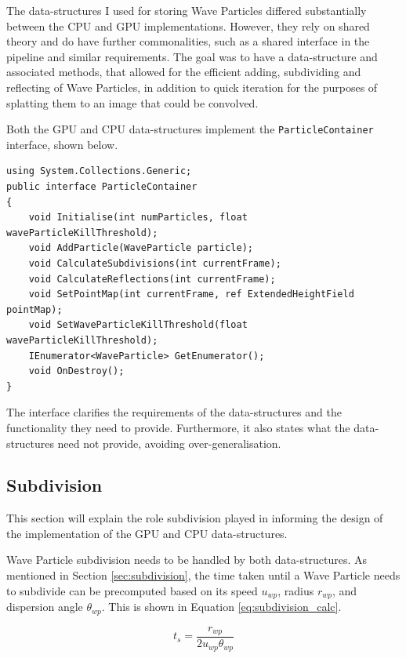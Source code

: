 \documentclass[12pt,a4paper,twoside]{report}
\begin{document}
The data-structures I used for storing Wave Particles differed substantially
between the CPU and GPU implementations. However, they rely on shared theory
and do have further commonalities, such as a shared interface in the pipeline
and similar requirements. The goal was to have a data-structure and associated
methods, that allowed for the efficient adding, subdividing and reflecting of
Wave Particles, in addition to quick iteration for the purposes of splatting
them to an image that could be convolved.

Both the GPU and CPU data-structures implement the \texttt{ParticleContainer}
interface, shown below.

\begin{lstlisting}[language={[Sharp]C}]
using System.Collections.Generic;
public interface ParticleContainer
{
    void Initialise(int numParticles, float waveParticleKillThreshold);
    void AddParticle(WaveParticle particle);
    void CalculateSubdivisions(int currentFrame);
    void CalculateReflections(int currentFrame);
    void SetPointMap(int currentFrame, ref ExtendedHeightField pointMap);
    void SetWaveParticleKillThreshold(float waveParticleKillThreshold);
    IEnumerator<WaveParticle> GetEnumerator();
    void OnDestroy();
}
\end{lstlisting}

The interface clarifies the requirements of the data-structures and the
functionality they need to provide. Furthermore, it also states what the
data-structures need not provide, avoiding over-generalisation.

\subsection{Subdivision}
\label{sec:implementation_subdivision}

This section will explain the role subdivision played in informing the design
of the implementation of the GPU and CPU data-structures.

Wave Particle subdivision needs to be handled by both data-structures. As
mentioned in Section \ref{sec:subdivision}, the time taken until a Wave
Particle needs to subdivide can be precomputed based on its speed $u_{wp}$,
radius $r_{wp}$, and dispersion angle $\theta_{wp}$. This is shown in Equation
\ref{eq:subdivision_calc}.

\begin{equation}
\label{eq:subdivision_calc}
t_s = \frac{r_{wp}}{2 u_{wp} \theta_{wp}}
\end{equation}
\end{document}
